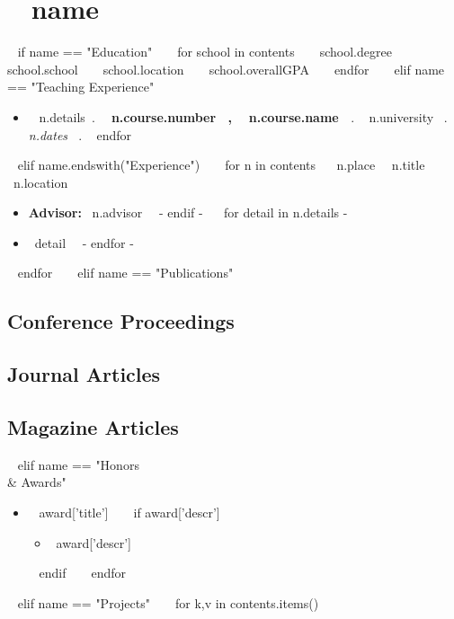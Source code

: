 \section{ ~{{ name }}~ }

~{ if name == "Education" }~
  ~{ for school in contents }~
      {~{{ school.degree }}~}%
      {~{{ school.school }}~}%
      {~{{ school.location }}~}%
      {~{{ school.overallGPA }}~}%
      {}
  ~{ endfor }~
~{ elif name == "Teaching Experience" }~
  \begin{itemize}
    ~{ for n in contents }~
      \item
        ~{{ n.details}}~.
        {\bf ~{{ n.course.number }}~, ~{{ n.course.name }}~}.
        ~{{ n.university }}~.
        {\it ~{{ n.dates }}~}.
    ~{ endfor }~
  \end{itemize}
~{ elif name.endswith("Experience") }~
  ~{ for n in contents }~
      {~{{n.place}}~}%
      {~{{n.title}}~}%
      {~{{n.location}}~}%
      {}%
      {
        \begin{itemize}
        ~{ if n.advisor -}~
          \item {\bf Advisor:} ~{{n.advisor}}~
        ~{- endif -}~
        ~{ for detail in n.details -}~
          \item ~{{detail}}~
        ~{- endfor -}~
        \end{itemize}
      }
  ~{ endfor }~
~{ elif name == "Publications" }~
  \nocite{*}

  \renewcommand*{\bibfont}{\small}
  \subsection{Conference Proceedings}
  \printbibliography[heading=none,type=inproceedings,prefixnumbers=C]

  \subsection{Journal Articles}
  \printbibliography[heading=none,type=article,keyword=journal,
    resetnumbers=true,prefixnumbers=J]

  \subsection{Magazine Articles}
  \printbibliography[heading=none,type=article,keyword=magazine,
    resetnumbers=true,prefixnumbers=M]

~{ elif name == "Honors \\& Awards" }~
  \begin{itemize}
  ~{ for award in contents }~
    \item ~{{ award['title'] }}~
    ~{ if award['descr'] }~
      \begin{itemize}
      \item {~{{award['descr']}}~}
      \end{itemize}
    ~{ endif }~
  ~{ endfor }~
  \end{itemize}
~{ elif name == "Projects" }~
  ~{ for k,v in contents.items() }~
